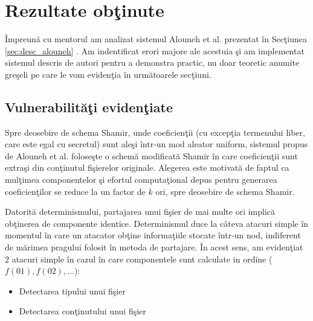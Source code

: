 \documentclass{llncs}
\newcommand{\todo}[1]{{\color{red}{TODO #1}}}
\begin{document}




\section{Rezultate ob\c{t}inute}
\label{sec:obtained_results}

\^{I}mpreun\u{a} cu mentorul am analizat sistemul Alouneh et al. prezentat \^{i}n Sec\c{t}iunea \ref{sec:desc_alouneh} \cite{AAMK:2013}.
 Am indentificat erori majore ale acestuia \c{s}i am implementat sistemul descris de autori pentru a demonstra practic, nu doar teoretic anumite gre\c{s}eli pe care le vom eviden\c{t}ia \^{i}n urm\u{a}toarele sec\c{t}iuni.

\subsection{Vulnerabilit\u{a}\c{t}i eviden\c{t}iate}

Spre deosebire de schema Shamir, unde coeficien\c{t}ii (cu excep\c{t}ia termenului liber, care este egal cu secretul) sunt ale\c{s}i \^{i}ntr-un mod aleator uniform, sistemul propus de Alouneh et al. folose\c{s}te o schem\u{a} modificat\u{a} Shamir \^{i}n care coeficien\c{t}ii sunt extra\c{s}i din con\c{t}inutul fi\c{s}ierelor originale.
Alegerea este motivat\u{a} de faptul ca mul\c{t}imea componentelor \c{s}i efortul computa\c{t}ional depus pentru generarea coeficien\c{t}ilor se reduce la un factor de $k$ ori, spre deosebire de schema Shamir.

Datorit\u{a} determinismului, partajarea unui fi\c{s}ier de mai multe ori implic\u{a} ob\c{t}inerea de componente identice.
Determinismul duce la c\^{a}teva atacuri simple \^{i}n momentul \^{i}n care un atacator ob\c{t}ine informa\c{t}iile stocate \^{i}ntr-un nod, indiferent de m\u{a}rimea pragului folosit \^{i}n metoda de partajare. \^{I}n acest sens, am eviden\c{t}iat $2$ atacuri simple \^{i}n cazul \^{i}n care componentele sunt calculate in ordine ($f(01), f(02), \dots$):
\begin{itemize}
	\item Detectarea tipului unui fi\c{s}ier
	\item Detectarea con\c{t}inutului unui fi\c{s}ier
\end{itemize}
\end{document}
